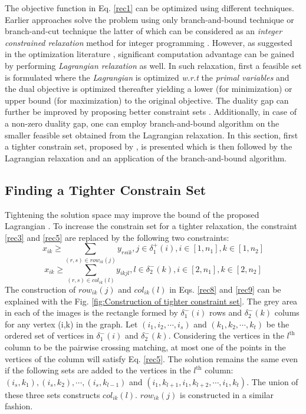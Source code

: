 The objective function in Eq. \ref{rec1} can be optimized using different techniques. Earlier approaches
\citep{carr00,cap04} solve the problem using only branch-and-bound technique \citep{past82,bets97} or branch-and-cut technique the latter of which can be considered as an \emph{integer constrained relaxation} method for integer programming \citep{mitc98}. However, as suggested in the optimization literature \citep{bert99,bets97}, significant computation advantage can be gained by performing \emph{Lagrangian relaxation} as well. In such relaxation, first a feasible set is formulated where the \emph{Lagrangian} is optimized \emph{w.r.t} the \emph{primal variables} and the dual objective is optimized thereafter yielding a lower (for minimization) or upper bound (for maximization) to the original objective. The duality gap can further be improved by proposing better constraint sets \citep{bert99,bets97}. Additionally, in case of a non-zero duality gap, one can employ branch-and-bound algorithm on the smaller feasible set obtained from the Lagrangian relaxation. In this section, first a tighter constrain set, proposed by \citet{anmy11}, is presented which is then followed by the Lagrangian relaxation and an application of the branch-and-bound algorithm.

\subsection{Finding a Tighter Constrain Set}

Tightening the solution space may improve the bound of the proposed Lagrangian \citep{ackm05,bert99}. To increase the constrain set for a tighter relaxation, the constraint \ref{rec3} and \ref{rec5} are replaced by the following two constraints:
\begin{equation}
\label{rec8}
x_{ik}  \geq \sum\limits_{(r,s) \in row _{ik}(j)}  y_{rsik} ,	    j\in {\delta _1^+(i)}, i \in [1,n_1] , k \in [1,n_2]
\end{equation}
\begin{equation}
\label{rec9}
x_{ik}  \geq \sum\limits_{(r,s) \in col _{ik} (l)}  y_{ikjl} ,	    l\in {\delta _2^-(k)}, i \in [2,n_1] , k \in [2,n_2]
\end{equation}
The construction of $row _{ik}(j)$ and $col _{ik} (l)$ in Eqs. \ref{rec8} and \ref{rec9} can be explained with the Fig. \ref{fig:Construction of tighter constraint set}. The grey area in each of the images is the rectangle formed by $\delta_1^-(i)$ rows and $\delta_2^-(k)$ colums for any vertex (i,k) in the graph. Let $(i_1,i_2,\cdots,i_s)$ and $(k_1,k_2,\cdots,k_t)$ be the ordered set of vertices in $\delta_1^-(i)$ and $\delta_2^-(k)$. Considering the vertices in the $l^{\text{th}}$ column to be the pairwise crossing matching, at most one of the points in the vertices of the column will satisfy Eq. \ref{rec5}. The solution remains the same even if the following sets are added to the vertices in the $l^{\text{th}}$ column:$(i_s,k_1),(i_s,k_2),\cdots,(i_s,k_{l-1})$ and $(i_1,k_{l+1},i_1,k_{l+2},\cdots,i_1,k_t)$. The union of these three sets constructs $col _{ik} (l)$. $row _{ik}(j)$ is constructed in a similar fashion.

